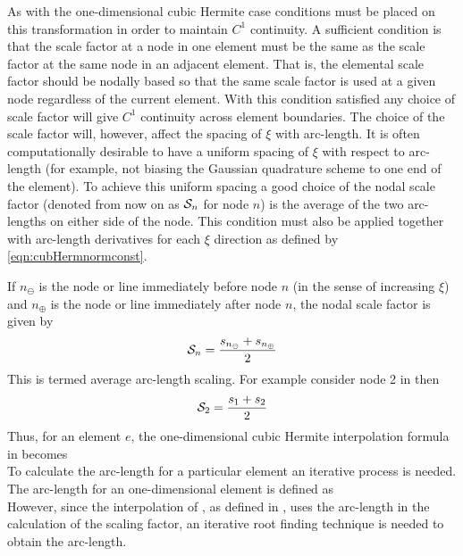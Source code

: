 As with the one-dimensional cubic Hermite case conditions must be placed on
this transformation in order to maintain $C^{1}$ continuity. A sufficient
condition is that the scale factor at a node in one element must be the same
as the scale factor at the same node in an adjacent element. That is, the
elemental scale factor should be nodally based so that the same scale factor
is used at a given node regardless of the current element. With this condition
satisfied any choice of scale factor will give $C^{1}$ continuity across
element boundaries. The choice of the scale factor will, however, affect the
spacing of $\xi$ with arc-length. It is often computationally desirable to
have a uniform spacing of $\xi$ with respect to arc-length (for example, not
biasing the Gaussian quadrature scheme to one end of the element). To achieve
this uniform spacing a good choice of the nodal scale factor (denoted from now
on as ${\cal S}_{n}$ for node $n$) is the average of the two arc-lengths on
either side of the node. This condition must also be applied together with
arc-length derivatives for each $\xi$ direction as defined by
\eqref{eqn:cubHermnormconst}.

If $n_{\ominus}$ is the node or line immediately before node $n$ (in the sense
of increasing $\xi$) and $n_{\oplus}$ is the node or line immediately after
node $n$, the nodal scale factor is given by
\begin{equation}
  {\cal S}_{n}=\frac{s_{n_{\ominus}}+s_{n_{\oplus}}}{2}
  \label{eqn:avearclenscale}
\end{equation}
This is termed average arc-length scaling.  For example consider node 2 in
 then
\[{\cal S}_{2}=\frac{s_{1}+s_{2}}{2}\]
Thus, for an element $e$, the one-dimensional cubic Hermite interpolation
formula in  becomes
\begin{equation}
  \label{eqn:cubHerminterp}
\end{equation}
To calculate the arc-length for a particular element an iterative process is
needed. The arc-length for an one-dimensional element is defined as
\begin{equation}
  \label{eqn:arclendef}
\end{equation}
However, since the interpolation of , as defined in
, uses the arc-length in the calculation of the
scaling factor, an iterative root finding technique is needed to obtain the
arc-length.

